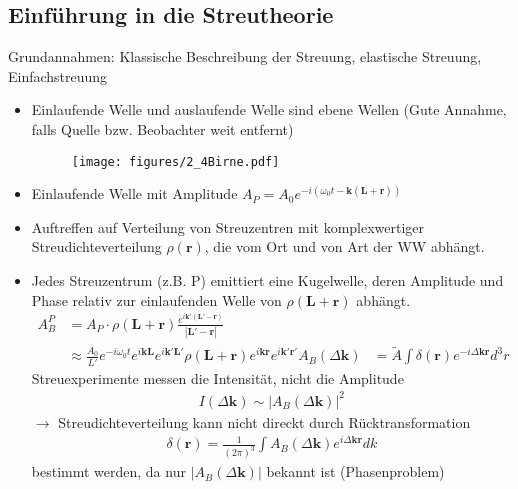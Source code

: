 \subsection{Einführung in die Streutheorie} \label{kap:3_1}
Grundannahmen: Klassische Beschreibung der Streuung, elastische Streuung, Einfachstreuung
\begin{itemize}
    \item Einlaufende Welle und auslaufende Welle sind ebene Wellen (Gute Annahme, falls Quelle bzw. Beobachter weit entfernt)
          \begin{figure}[H]
              \centering
              \texttt{[image: figures/2\_4Birne.pdf]}
              \caption{}
              \label{}
          \end{figure}
    \item Einlaufende Welle mit Amplitude $A_P = A_0 e^{-i(\omega_0 t - \textbf{k} ( \textbf{L} + \textbf{r}))}$
    \item Auftreffen auf Verteilung von Streuzentren mit komplexwertiger Streudichteverteilung $\rho(\textbf{r})$, die vom Ort und von Art der WW abhängt.
    \item Jedes Streuzentrum (z.B. P) emittiert eine Kugelwelle, deren Amplitude und Phase relativ zur einlaufenden Welle von $\rho(\textbf{L} + \textbf{r})$ abhängt.
          \begin{align*}
              A_B^P                   & = A_P \cdot \rho(\textbf{L} + \textbf{r}) \frac{e^{i\textbf{k}' ( \textbf{L}' - \textbf{r})}}{|\textbf{L}' - \textbf{r}|}                                                                   \\
                                      & \approx \frac{A_0}{L'} e^{-i \omega_0 t} e^{i \textbf{k} \textbf{L}} e^{i \textbf{k}' \textbf{L}'} \rho(\textbf{L} + \textbf{r})  e^{i \textbf{k} \textbf{r}} e^{i \textbf{k}' \textbf{r}'}
              A_B (\Delta \textbf{k}) & = \tilde{A} \int \delta(\textbf{r})e^{-i \Delta\textbf{kr}}d^3r
          \end{align*}
          Streuexperimente messen die Intensität, nicht die Amplitude
          \begin{align*}
              I(\Delta \textbf{k}) \sim \left| A_B(\Delta \textbf{k}) \right|^2
          \end{align*}
          $\rightarrow$ Streudichteverteilung kann nicht direckt durch Rücktransformation
          \begin{align*}
              \delta(\textbf{r}) = \frac{1}{(2\pi)^3}\int A_B(\Delta \textbf{k}) e^{i \Delta\textbf{kr}} dk
          \end{align*}
          bestimmt werden, da nur $\left|A_B(\Delta \textbf{k}) \right|$ bekannt ist (Phasenproblem)
\end{itemize}




